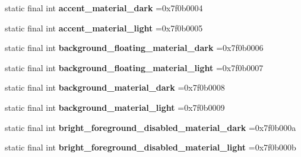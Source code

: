 \begin{DoxyCompactItemize}
\item 
\hypertarget{classcheck_1_1test_1_1_r_1_1color_aa0a9f9f11878c265921391c80a7e9743}{}static final int {\bfseries accent\+\_\+material\+\_\+dark} =0x7f0b0004\label{classcheck_1_1test_1_1_r_1_1color_aa0a9f9f11878c265921391c80a7e9743}

\item 
\hypertarget{classcheck_1_1test_1_1_r_1_1color_a0181083101dc5725d70ce5c1b876fb4a}{}static final int {\bfseries accent\+\_\+material\+\_\+light} =0x7f0b0005\label{classcheck_1_1test_1_1_r_1_1color_a0181083101dc5725d70ce5c1b876fb4a}

\item 
\hypertarget{classcheck_1_1test_1_1_r_1_1color_aa512eed0e43492ba918ef4e20df874c7}{}static final int {\bfseries background\+\_\+floating\+\_\+material\+\_\+dark} =0x7f0b0006\label{classcheck_1_1test_1_1_r_1_1color_aa512eed0e43492ba918ef4e20df874c7}

\item 
\hypertarget{classcheck_1_1test_1_1_r_1_1color_a1cb52877278a8cfaf7bcf880d15b1bc7}{}static final int {\bfseries background\+\_\+floating\+\_\+material\+\_\+light} =0x7f0b0007\label{classcheck_1_1test_1_1_r_1_1color_a1cb52877278a8cfaf7bcf880d15b1bc7}

\item 
\hypertarget{classcheck_1_1test_1_1_r_1_1color_a983a8b2138dc5e2680c50fc659c853c5}{}static final int {\bfseries background\+\_\+material\+\_\+dark} =0x7f0b0008\label{classcheck_1_1test_1_1_r_1_1color_a983a8b2138dc5e2680c50fc659c853c5}

\item 
\hypertarget{classcheck_1_1test_1_1_r_1_1color_a2d873c4946de34c906b29ae45b2d3ee8}{}static final int {\bfseries background\+\_\+material\+\_\+light} =0x7f0b0009\label{classcheck_1_1test_1_1_r_1_1color_a2d873c4946de34c906b29ae45b2d3ee8}

\item 
\hypertarget{classcheck_1_1test_1_1_r_1_1color_aaa9ad374bf1abeabe8360eaa336923d7}{}static final int {\bfseries bright\+\_\+foreground\+\_\+disabled\+\_\+material\+\_\+dark} =0x7f0b000a\label{classcheck_1_1test_1_1_r_1_1color_aaa9ad374bf1abeabe8360eaa336923d7}

\item 
\hypertarget{classcheck_1_1test_1_1_r_1_1color_af4bf7b9d5819b25ea60c04441d2ed98f}{}static final int {\bfseries bright\+\_\+foreground\+\_\+disabled\+\_\+material\+\_\+light} =0x7f0b000b\label{classcheck_1_1test_1_1_r_1_1color_af4bf7b9d5819b25ea60c04441d2ed98f}


\end{DoxyCompactItemize}
